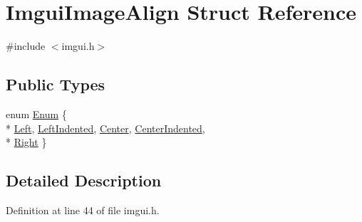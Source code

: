 \hypertarget{struct_imgui_image_align}{\section{Imgui\+Image\+Align Struct Reference}
\label{struct_imgui_image_align}
}


{\ttfamily \#include $<$imgui.\+h$>$}

\subsection*{Public Types}
\begin{DoxyCompactItemize}
\item 
enum \hyperlink{struct_imgui_image_align_a5f02ce5e32468b0d112123cf21437313}{Enum} \{ \\*
\hyperlink{struct_imgui_image_align_a5f02ce5e32468b0d112123cf21437313abae2e3f4dec7ed46eb5db2aa381c1b21}{Left}, 
\hyperlink{struct_imgui_image_align_a5f02ce5e32468b0d112123cf21437313a9f4dafbd6cb6d2b63150de09a179a428}{Left\+Indented}, 
\hyperlink{struct_imgui_image_align_a5f02ce5e32468b0d112123cf21437313a0b8ef8ab5593114642a4d711e0957304}{Center}, 
\hyperlink{struct_imgui_image_align_a5f02ce5e32468b0d112123cf21437313af17e72f84a7de51b7f41e30ab9ef2629}{Center\+Indented}, 
\\*
\hyperlink{struct_imgui_image_align_a5f02ce5e32468b0d112123cf21437313a275db07dfb5e83f49b26bb7d7c4f4ce2}{Right}
 \}
\end{DoxyCompactItemize}


\subsection{Detailed Description}


Definition at line 44 of file imgui.\+h.



